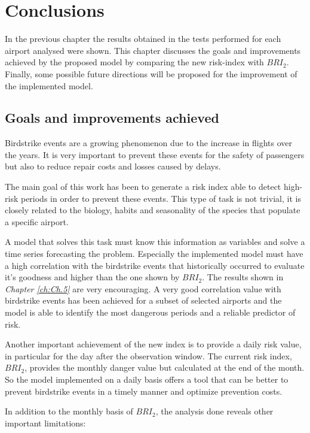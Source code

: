 \chapter{Conclusions}\label{ch:Ch.6}
In the previous chapter the results obtained in the tests performed for each airport analysed were shown. This chapter discusses the goals and improvements achieved by the proposed model by comparing the new risk-index with $BRI_2$. 
Finally, some possible future directions will be proposed for the improvement of the implemented model.

\section{Goals and improvements achieved}
Birdstrike events are a growing phenomenon due to the increase in flights over the years. It is very important to prevent these events for the safety of passengers but also to reduce repair costs and losses caused by delays.

The main goal of this work has been to generate a risk index able to detect high-risk periods in order to prevent these events. 
This type of task is not trivial, it is closely related to the biology, habits and seasonality of the species that populate a specific airport.

A model that solves this task must know this information as variables and solve a time series forecasting the problem.
Especially the implemented model must have a high correlation with the birdstrike events that historically occurred to evaluate it's goodness and higher than the one shown by $BRI_2$.
The results shown in \textit{Chapter \ref{ch:Ch.5}} are very encouraging.
A very good correlation value with birdstrike events has been achieved for a subset of selected airports and the model is able to identify the most dangerous periods and a reliable predictor of risk.

Another important achievement of the new index is to provide a daily risk value, in particular for the day after the observation window. The current risk index, $BRI_2$, provides the monthly danger value but calculated at the end of the month.
So the model implemented on a daily basis offers a tool that can be better to prevent birdstrike events in a timely manner and optimize prevention costs.

In addition to the monthly basis of $BRI_2$, the analysis done reveals other important limitations:

